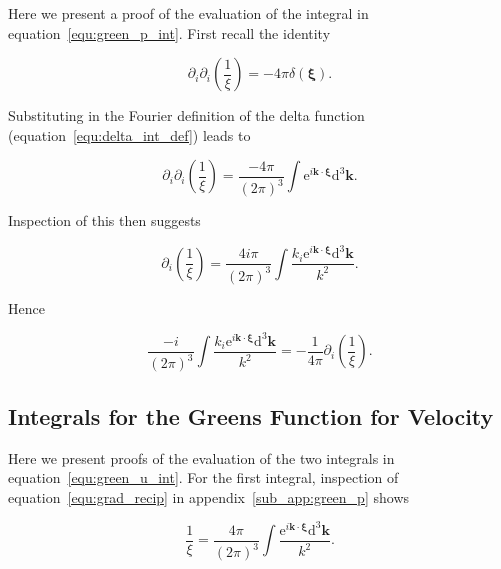 \documentclass[12pt]{article}
\begin{document}
Here we present a proof of the evaluation of the integral in equation~\ref{equ:green_p_int}. First recall the identity \citep{Jackson99, Frahm82}

\begin{equation}
\label{equ:laplace_recip_squared}
\partial_{i} \partial_{i}\left(\frac{1}{\xi}\right) = -4 \pi \delta(\boldsymbol{\xi}).
\end{equation}


Substituting in the Fourier definition of the delta function (equation~\ref{equ:delta_int_def}) leads to

\begin{equation}
\label{equ:del_square_recip}
\partial_{i} \partial_{i} \left(\frac{1}{\xi}\right) = \frac{-4 \pi}{(2 \pi)^{3}} \int \mathrm{e}^{i \boldsymbol{k} \cdot \boldsymbol{\xi}} \mathrm{d}^{3} \boldsymbol{k} .
\end{equation}

Inspection of this then suggests

\begin{equation}
\label{equ:grad_recip}
\partial_{i} \left(\frac{1}{\xi}\right) = \frac{4 i \pi}{(2 \pi)^{3}} \int \frac{ k_{i} \mathrm{e}^{i \boldsymbol{k} \cdot \boldsymbol{\xi}} \mathrm{d}^{3} \boldsymbol{k}}{k^{2}} .
\end{equation}

Hence

\begin{equation}
\label{equ:green_p_ident}
\frac{-i}{(2 \pi)^{3}} \int \frac{ k_{i} \mathrm{e}^{i \boldsymbol{k} \cdot \boldsymbol{\xi}} \mathrm{d}^{3} \boldsymbol{k}}{k^{2}} = -\frac{1}{4 \pi} \partial_{i} \left(\frac{1}{\xi}\right) .
\end{equation}

\subsection{Integrals for the Greens Function for Velocity}
\label{sub_app:green_vel}

Here we present proofs of the evaluation of the two integrals in equation~\ref{equ:green_u_int}. For the first integral, inspection of equation~\ref{equ:grad_recip} in appendix~\ref{sub_app:green_p} shows

\begin{equation}
\label{equ:recip_int}
\frac{1}{\xi} = \frac{4 \pi}{(2 \pi)^{3}} \int \frac{\mathrm{e}^{i \boldsymbol{k} \cdot \boldsymbol{\xi}} \mathrm{d}^{3} \boldsymbol{k}}{k^{2}} .
\end{equation}
\end{document}
